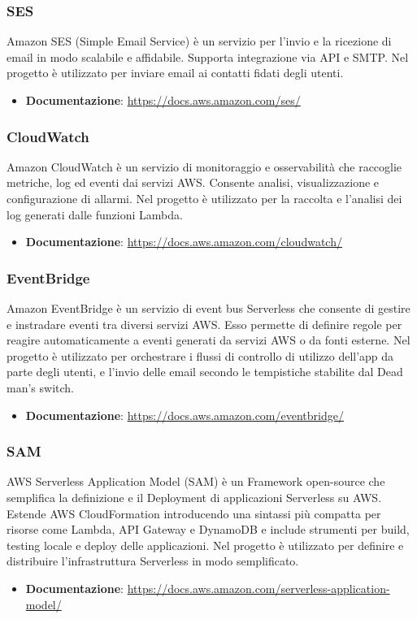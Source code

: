 \documentclass[a4paper,12pt]{article}
\begin{document}
\subsubsection{SES}
Amazon SES (Simple Email Service) è un servizio per l'invio e la ricezione di email in modo scalabile e affidabile. Supporta integrazione via API e SMTP. Nel progetto è utilizzato per inviare email ai contatti fidati degli utenti.
\begin{itemize}
    \item \textbf{Documentazione}: \url{https://docs.aws.amazon.com/ses/}
\end{itemize}

\subsubsection{CloudWatch}
Amazon CloudWatch è un servizio di monitoraggio e osservabilità che raccoglie metriche, log ed eventi dai servizi AWS. Consente analisi, visualizzazione e configurazione di allarmi. Nel progetto è utilizzato per la raccolta e l'analisi dei log generati dalle funzioni Lambda.
\begin{itemize}
    \item \textbf{Documentazione}: \url{https://docs.aws.amazon.com/cloudwatch/}
\end{itemize}

\subsubsection{EventBridge}
Amazon EventBridge è un servizio di event bus Serverless che consente di gestire e instradare eventi tra diversi servizi AWS. Esso permette di definire regole per reagire automaticamente a eventi generati da servizi AWS o da fonti esterne. Nel progetto è utilizzato per orchestrare i flussi di controllo di utilizzo dell'app da parte degli utenti, e l'invio delle email secondo le tempistiche stabilite dal Dead man's switch.
\begin{itemize}
    \item \textbf{Documentazione}: \url{https://docs.aws.amazon.com/eventbridge/}
\end{itemize}

\subsubsection{SAM}
AWS Serverless Application Model (SAM) è un Framework open-source che semplifica la definizione e il Deployment di applicazioni Serverless su AWS. Estende AWS CloudFormation introducendo una sintassi più compatta per risorse come Lambda, API Gateway e DynamoDB e include strumenti per build, testing locale e deploy delle applicazioni. Nel progetto è utilizzato per definire e distribuire l'infrastruttura Serverless in modo semplificato.
\begin{itemize}
    \item \textbf{Documentazione}: \url{https://docs.aws.amazon.com/serverless-application-model/}
\end{itemize}
\end{document}
